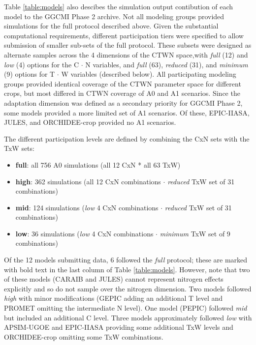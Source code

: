 \documentclass[gmd, manuscript]{copernicus} %
\begin{document}
Table \ref{table:models} also descibes the simulation output contibution of each model to the GGCMI Phase 2 archive.
Not all modeling groups provided simulations for the full protocol described above. 
Given the substantial computational requirements, different participation tiers were specified to allow submission of smaller sub-sets of the full protocol. 
These subsets were designed as alternate samples across the 4 dimensions of the CTWN space,with \textit{full} (12) and \textit{low} (4) options for the C $\cdot$ N variables, and \textit{full} (63), \textit{reduced} (31), and \textit{minimum} (9) options for T $\cdot$ W variables (described below). 
All participating modeling groups provided identical coverage of the CTWN parameter space for different crops, but most differed in CTWN coverage of A0 and A1 scenarios. Since the adaptation dimension was defined as a secondary priority for GGCMI Phase 2, some models provided a more limited set of A1 scenarios. Of these, EPIC-IIASA, JULES, and ORCHIDEE-crop provided no A1 scenarios.

The different participation levels are defined by combining the CxN sets with the TxW sets:
\begin{itemize}
  \item{\textbf{full}: all 756 A0 simulations (all 12 CxN * all 63 TxW)}
  \item{\textbf{high}: 362 simulations (all 12 CxN combinations  $\cdot$ \textit{reduced} TxW set of 31 combinations)}
  \item{\textbf{mid}: 124 simulations (\textit{low} 4 CxN combinations $\cdot$ \textit{reduced} TxW set of 31 combinations)}
  \item{\textbf{low}: 36 simulations (\textit{low} 4 CxN combinations $\cdot$ \textit{minimum} TxW set of 9 combinations)}
\end{itemize}

\noindent Of the 12 models submitting data, 6 followed the \textit{full} protocol; these are marked with bold text in the last column of Table \ref{table:models}. 
However, note that two of these models (CARAIB and JULES) cannot represent nitrogen effects explicitly and so do not sample over the nitrogen dimension. 
Two models followed \textit{high} with minor modifications (GEPIC adding an additional T level and PROMET omitting the intermediate N level). 
One model (PEPIC) followed \textit{mid} but included an additional C level. 
Three models approximately followed \textit{low} with APSIM-UGOE and EPIC-IIASA providing some additional TxW levels and ORCHIDEE-crop omitting some TxW combinations.  
\end{document}
